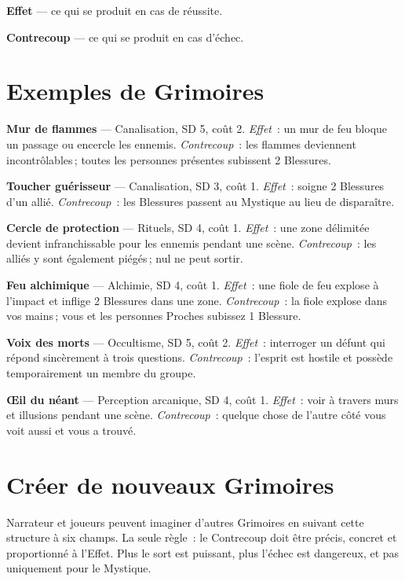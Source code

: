 \documentclass[10pt,a4paper]{article}
\begin{document}
\textbf{Effet} — ce qui se produit en cas de réussite.

\textbf{Contrecoup} — ce qui se produit en cas d'échec.

\section*{Exemples de Grimoires}
\textbf{Mur de flammes} — Canalisation, SD 5, coût 2. \textit{Effet}~: un mur de feu bloque un passage ou encercle les ennemis. \textit{Contrecoup}~: les flammes deviennent incontrôlables ; toutes les personnes présentes subissent 2 Blessures.

\textbf{Toucher guérisseur} — Canalisation, SD 3, coût 1. \textit{Effet}~: soigne 2 Blessures d'un allié. \textit{Contrecoup}~: les Blessures passent au Mystique au lieu de disparaître.

\textbf{Cercle de protection} — Rituels, SD 4, coût 1. \textit{Effet}~: une zone délimitée devient infranchissable pour les ennemis pendant une scène. \textit{Contrecoup}~: les alliés y sont également piégés ; nul ne peut sortir.

\textbf{Feu alchimique} — Alchimie, SD 4, coût 1. \textit{Effet}~: une fiole de feu explose à l'impact et inflige 2 Blessures dans une zone. \textit{Contrecoup}~: la fiole explose dans vos mains ; vous et les personnes Proches subissez 1 Blessure.

\textbf{Voix des morts} — Occultisme, SD 5, coût 2. \textit{Effet}~: interroger un défunt qui répond sincèrement à trois questions. \textit{Contrecoup}~: l'esprit est hostile et possède temporairement un membre du groupe.

\textbf{Œil du néant} — Perception arcanique, SD 4, coût 1. \textit{Effet}~: voir à travers murs et illusions pendant une scène. \textit{Contrecoup}~: quelque chose de l'autre côté vous voit aussi et vous a trouvé.

\section*{Créer de nouveaux Grimoires}
Narrateur et joueurs peuvent imaginer d'autres Grimoires en suivant cette structure à six champs. La seule règle~: le Contrecoup doit être précis, concret et proportionné à l'Effet. Plus le sort est puissant, plus l'échec est dangereux, et pas uniquement pour le Mystique.

\end{document}
